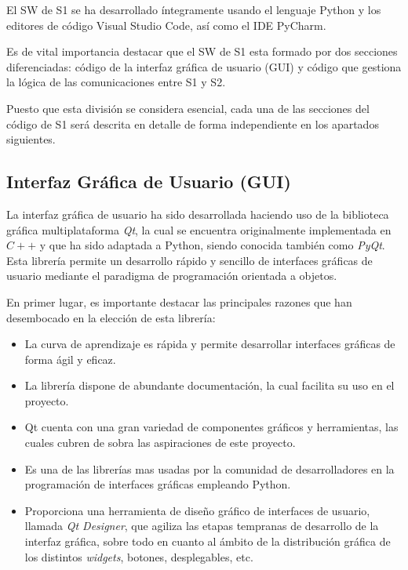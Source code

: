 El \ac{SW} de \ac{S1} se ha desarrollado íntegramente usando el lenguaje Python y los editores de código Visual Studio Code, así como el IDE PyCharm.

Es de vital importancia destacar que el \ac{SW} de \ac{S1} esta formado por dos secciones diferenciadas: código de la interfaz gráfica de usuario (GUI) y código que gestiona la lógica de las comunicaciones entre \ac{S1} y \ac{S2}.

Puesto que esta división se considera esencial, cada una de las secciones del código de \ac{S1} será descrita en detalle de forma independiente en los apartados siguientes.

\subsection{Interfaz Gráfica de Usuario (GUI)}

La interfaz gráfica de usuario ha sido desarrollada haciendo uso de la biblioteca gráfica multiplataforma \textit{Qt}, la cual se encuentra originalmente implementada en $C++$ y que ha sido adaptada a Python, siendo conocida también como \textit{PyQt}. Esta librería permite un desarrollo rápido y sencillo de interfaces gráficas de usuario mediante el paradigma de programación orientada a objetos.

En primer lugar, es importante destacar las principales razones que han desembocado en la elección de esta librería:
\begin{itemize}
    \item La curva de aprendizaje es rápida y permite desarrollar interfaces gráficas de forma ágil y eficaz.
    \item La librería dispone de abundante documentación, la cual facilita su uso en el proyecto.
    \item Qt cuenta con una gran variedad de componentes gráficos y herramientas, las cuales cubren de sobra las aspiraciones de este proyecto.
    \item Es una de las librerías mas usadas por la comunidad de desarrolladores en la programación de interfaces gráficas empleando Python.
    \item Proporciona una herramienta de diseño gráfico de interfaces de usuario, llamada \textit{Qt Designer}, que agiliza las etapas tempranas de desarrollo de la interfaz gráfica, sobre todo en cuanto al ámbito de la distribución gráfica de los distintos \textit{widgets}, botones, desplegables, etc.
\end{itemize}

